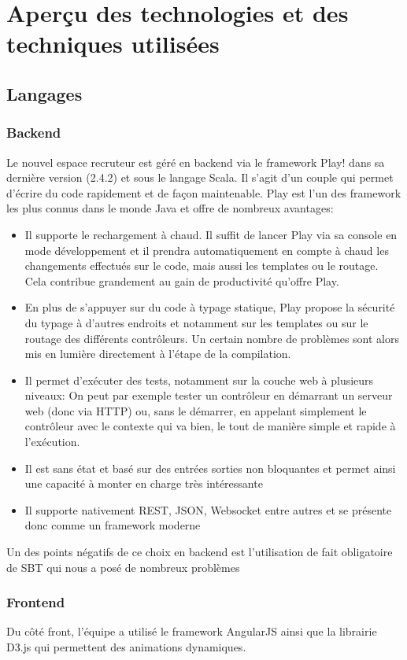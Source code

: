 \section{Aperçu des technologies et des techniques utilisées}

\subsection{Langages}
\label{sub:Langages}
\subsubsection{Backend}
\label{subs:Backend}
Le nouvel espace recruteur est géré en backend via le framework Play! dans sa dernière version (2.4.2) et sous le langage Scala.
Il s'agit d'un couple qui permet d'écrire du code rapidement et de façon maintenable.
Play est l'un des framework les plus connus dans le monde Java et offre de nombreux avantages:
\begin{itemize}
  \item Il supporte le rechargement à chaud.
  Il suffit de lancer Play via sa console en mode développement et il prendra automatiquement en compte à chaud les changements effectués sur le code, mais aussi les templates ou le routage.
  Cela contribue grandement au gain de productivité qu'offre Play.
  \item En plus de s’appuyer sur du code à typage statique, Play propose la sécurité du typage à d’autres endroits et notamment sur les templates ou sur le routage des différents contrôleurs.
  Un certain nombre de problèmes sont alors mis en lumière directement à l’étape de la compilation.
  \item Il permet d'exécuter des tests, notamment sur la couche web à plusieurs niveaux:
  On peut par exemple tester un contrôleur en démarrant un serveur web (donc via HTTP) ou, sans le démarrer, en appelant simplement le contrôleur avec le contexte qui va bien, le tout de manière simple et rapide à l’exécution.
  \item Il est sans état et basé sur des entrées sorties non bloquantes et permet ainsi une capacité à monter en charge très intéressante
  \item Il supporte nativement REST, JSON, Websocket entre autres et se présente donc comme un framework moderne
\end{itemize}
Un des points négatifs de ce choix en backend est l'utilisation de fait obligatoire de SBT qui nous a posé de nombreux problèmes
\subsubsection{Frontend}
\label{subs:Frontend}
Du côté front, l'équipe a utilisé le framework AngularJS ainsi que la librairie D3.js qui permettent des animations dynamiques.
